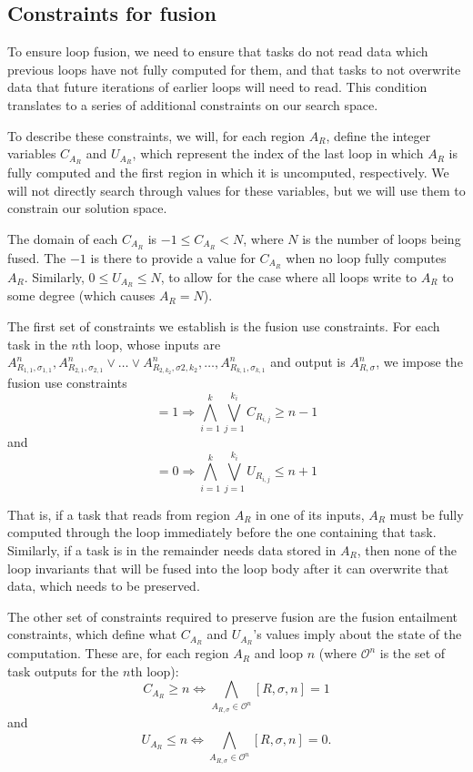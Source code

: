\documentclass[12pt,letterpaper]{article}
\newcommand*{\outputs}{\mathcal{O}}
\begin{document}
\subsection{Constraints for fusion}
To ensure loop fusion, we need to ensure that tasks do not read data which previous loops have not fully computed for them, and that tasks to not overwrite data that future iterations of earlier loops will need to read.
This condition translates to a series of additional constraints on our search space.

To describe these constraints, we will, for each region $A_R$, define the integer variables $C_{A_R}$ and $U_{A_R}$, which represent the index of the last loop in which $A_R$ is fully computed and the first region in which it is uncomputed, respectively.
We will not directly search through values for these variables, but we will use them to constrain our solution space.

The domain of each $C_{A_R}$ is $-1 \leq C_{A_R} < N$, where $N$ is the number of loops being fused.
The $-1$ is there to provide a value for $C_{A_R}$ when no loop fully computes $A_R$.
Similarly, $0 \leq U_{A_R} \leq N$, to allow for the case where all loops write to $A_R$ to some degree (which causes $A_R = N$).

The first set of constraints we establish is the fusion use constraints.
For each task in the $n$th loop, whose inputs are $A^n_{R_{1, 1}, \sigma_{1, 1}}, A^n_{R_{2, 1}, \sigma_{2, 1}} \vee \ldots \vee A^n_{R_{2, k_2}, \sigma{2, k_2}}, \ldots, A^n_{R_{k, 1}, \sigma_{k, 1}}$ and output is $A_{R, \sigma}^n$, we impose the fusion use constraints
\begin{equation*}
  [R, \sigma, n] = 1 \Rightarrow \bigwedge_{i = 1}^k \bigvee_{j = 1}^{k_i} C_{R_{i, j}} \geq n - 1
\end{equation*}
and
\begin{equation*}
  [R, \sigma, n] = 0 \Rightarrow \bigwedge_{i = 1}^k \bigvee_{j = 1}^{k_i} U_{R_{i, j}} \leq n + 1
\end{equation*}

That is, if a task that reads from region $A_R$ in one of its inputs, $A_R$ must be fully computed through the loop immediately before the one containing that task.
Similarly, if a task is in the remainder needs data stored in $A_R$, then none of the loop invariants that will be fused into the loop body after it can overwrite that data, which needs to be preserved.

The other set of constraints required to preserve fusion are the fusion entailment constraints, which define what $C_{A_R}$ and $U_{A_R}$'s values imply about the state of the computation.
These are, for each region $A_R$ and loop $n$ (where $\outputs^n$ is the set of task outputs for the $n$th loop):
\begin{equation*}
  C_{A_R} \geq n \Leftrightarrow \bigwedge_{A_{R, \sigma} \in \outputs^n} [R, \sigma, n] = 1
\end{equation*}
and
\begin{equation*}
  U_{A_R} \leq n \Leftrightarrow \bigwedge_{A_{R, \sigma} \in \outputs^n} [R, \sigma, n] = 0.
\end{equation*}
\end{document}
